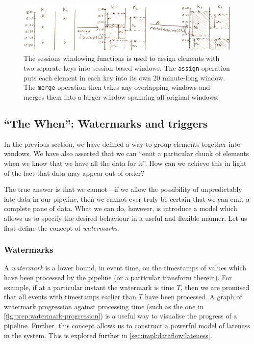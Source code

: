 \begin{figure}[t]
	\includegraphics[width=\textwidth]{images/temp/sessions-assign-merge}
	\caption{The sessions windowing functions is used to assign elements with two separate keys into session-based windows. The \texttt{assign} operation puts each element in each key into its own 20 minute-long window. The \texttt{merge} operation then takes any overlapping windows and merges them into a larger window spanning all original windows.}
	\label{fig:prep:sessions-merge}
\end{figure}


\subsection{``The When'': Watermarks and triggers}\label{sec:prep:dataflow:when}

In the previous section, we have defined a way to group elements together into windows.
We have also asserted that we can ``emit a particular chunk of elements when we know that we have all the data for it''.
How can we achieve this in light of the fact that data may appear out of order?

The true answer is that we cannot---if we allow the possibility of unpredictably late data in our pipeline, then we cannot ever truly be certain that we can emit a complete pane of data.
What we can do, however, is introduce a model which allows us to specify the desired behaviour in a useful and flexible manner.
Let us first define the concept of \emph{watermarks}.

\subsubsection{Watermarks}

A \emph{watermark} is a lower bound, in event time, on the timestamps of values which have been processed by the pipeline (or a particular transform therein).
For example, if at a particular instant the watermark is time $T$, then we are promised that all events with timestamps earlier than $T$ have been processed.
A graph of watermark progression against processing time (such as the one in \cref{fig:prep:watermark-progression}) is a useful way to visualise the progress of a pipeline.
Further, this concept allows us to construct a powerful model of lateness in the system.
This is explored further in \cref{sec:impl:dataflow:lateness}.

